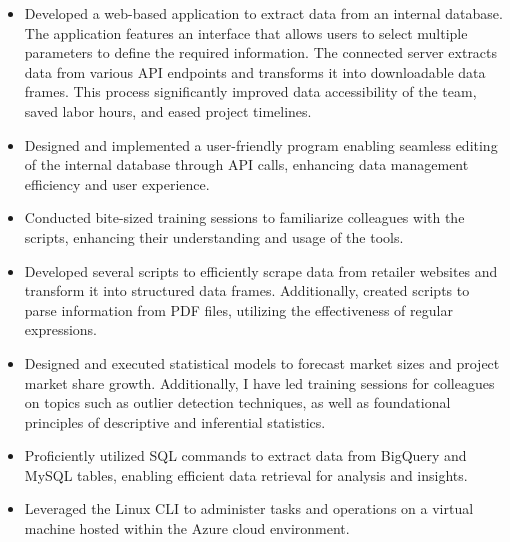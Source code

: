 \documentclass[9pt,a4paper]{altacv}
\begin{document}
\begin{itemize}
    \item Developed a web-based application to extract data from an internal database. The application features an interface that allows users to select multiple parameters to define the required information. The connected server extracts data from various API endpoints and transforms it into downloadable data frames. This process significantly improved data accessibility of the team, saved labor hours, and eased project timelines.
    \item Designed and implemented a user-friendly program enabling seamless editing of the internal database through API calls, enhancing data management efficiency and user experience.
    \item Conducted bite-sized training sessions to familiarize colleagues with the scripts, enhancing their understanding and usage of the tools.
    \item Developed several scripts to efficiently scrape data from retailer websites and transform it into structured data frames. Additionally, created scripts to parse information from PDF files, utilizing the effectiveness of regular expressions.
    \item Designed and executed statistical models to forecast market sizes and project market share growth. Additionally, I have led training sessions for colleagues on topics such as outlier detection techniques, as well as foundational principles of descriptive and inferential statistics.
    \item Proficiently utilized SQL commands to extract data from BigQuery and MySQL tables, enabling efficient data retrieval for analysis and insights.
    \item Leveraged the Linux CLI to administer tasks and operations on a virtual machine hosted within the Azure cloud environment.
\end{itemize}
\end{document}
